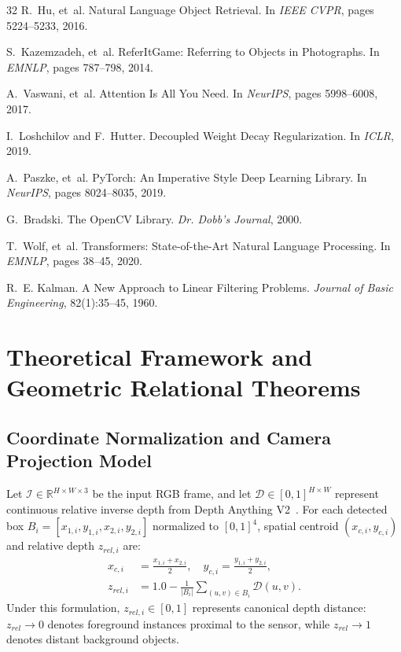 \documentclass[10pt,twocolumn,letterpaper]{article}
\begin{document}
\begin{thebibliography}{32}
R.~Hu, et~al.
\newblock Natural Language Object Retrieval.
\newblock In \emph{IEEE CVPR}, pages 5224--5233, 2016.

S.~Kazemzadeh, et~al.
\newblock ReferItGame: Referring to Objects in Photographs.
\newblock In \emph{EMNLP}, pages 787--798, 2014.

A.~Vaswani, et~al.
\newblock Attention Is All You Need.
\newblock In \emph{NeurIPS}, pages 5998--6008, 2017.

I.~Loshchilov and F.~Hutter.
\newblock Decoupled Weight Decay Regularization.
\newblock In \emph{ICLR}, 2019.

A.~Paszke, et~al.
\newblock PyTorch: An Imperative Style Deep Learning Library.
\newblock In \emph{NeurIPS}, pages 8024--8035, 2019.

G.~Bradski.
\newblock The OpenCV Library.
\newblock \emph{Dr. Dobb's Journal}, 2000.

T.~Wolf, et~al.
\newblock Transformers: State-of-the-Art Natural Language Processing.
\newblock In \emph{EMNLP}, pages 38--45, 2020.

R.~E. Kalman.
\newblock A New Approach to Linear Filtering Problems.
\newblock \emph{Journal of Basic Engineering}, 82(1):35--45, 1960.

\end{thebibliography}

\clearpage
\appendix

\section{Theoretical Framework and Geometric Relational Theorems}
\label{app:theorems}

\subsection{Coordinate Normalization and Camera Projection Model}
Let $\mathcal{I} \in \mathbb{R}^{H \times W \times 3}$ be the input RGB frame, and let $\mathcal{D} \in [0, 1]^{H \times W}$ represent continuous relative inverse depth from Depth Anything V2~\cite{yang2024depthanything}. For each detected box $B_i = [x_{1,i}, y_{1,i}, x_{2,i}, y_{2,i}]$ normalized to $[0, 1]^4$, spatial centroid $(x_{c,i}, y_{c,i})$ and relative depth $z_{rel,i}$ are:
\begin{align}
x_{c,i} &= \frac{x_{1,i} + x_{2,i}}{2}, \quad y_{c,i} = \frac{y_{1,i} + y_{2,i}}{2}, \\
z_{rel,i} &= 1.0 - \frac{1}{|B_i|} \sum_{(u, v) \in B_i} \mathcal{D}(u, v).
\end{align}
Under this formulation, $z_{rel,i} \in [0, 1]$ represents canonical depth distance: $z_{rel} \to 0$ denotes foreground instances proximal to the sensor, while $z_{rel} \to 1$ denotes distant background objects.
\end{document}
